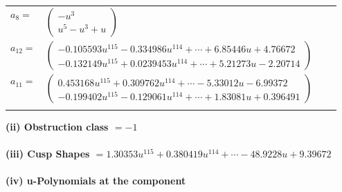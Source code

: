 \documentclass[1p]{elsarticle_modified}
\theoremstyle{definition}
\begin{document}
\begin{tabular}{m{7pt} m{180pt} m{7pt} m{180pt} }
\flushright $a_{8}=$&$\begin{pmatrix}- u^3\\u^5- u^3+u\end{pmatrix}$ \\
\flushright $a_{12}=$&$\begin{pmatrix}-0.105593 u^{115}-0.334986 u^{114}+\cdots+6.85446 u+4.76672\\-0.132149 u^{115}+0.0239453 u^{114}+\cdots+5.21273 u-2.20714\end{pmatrix}$ \\
\flushright $a_{11}=$&$\begin{pmatrix}0.453168 u^{115}+0.309762 u^{114}+\cdots-5.33012 u-6.99372\\-0.199402 u^{115}-0.129061 u^{114}+\cdots+1.83081 u+0.396491\end{pmatrix}$\\&\end{tabular}
\flushleft \textbf{(ii) Obstruction class $= -1$}\\~\\
\flushleft \textbf{(iii) Cusp Shapes $= 1.30353 u^{115}+0.380419 u^{114}+\cdots-48.9228 u+9.39672$}\\~\\
\newpage\renewcommand{\arraystretch}{1}
\flushleft \textbf{(iv) u-Polynomials at the component}\newline \\
\end{document}
